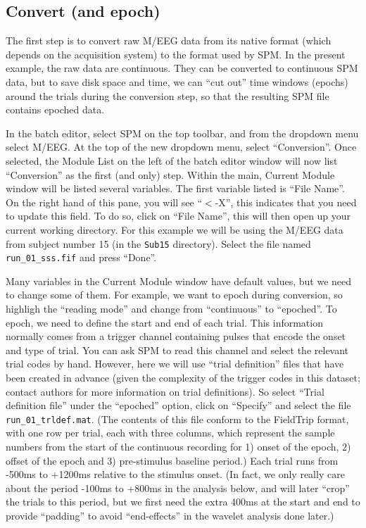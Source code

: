 \subsection{Convert (and epoch)}

The first step is to convert raw M/EEG data from its native format (which depends on the acquisition system) to the format used by SPM.  In the present example, the raw data are continuous. They can be converted to continuous SPM data, but to save disk space and time, we can ``cut out'' time windows (epochs) around the trials during the conversion step, so that the resulting SPM file contains epoched data.

In the batch editor, select SPM on the top toolbar, and from the dropdown menu select M/EEG. At the top of the new dropdown menu, select ``Conversion''. Once selected, the Module List on the left of the batch editor window will now list ``Conversion'' as the first (and only) step. Within the main, Current Module window will be listed several variables. The first variable listed is ``File Name''. On the right hand of this pane, you will see ``\(<\)-X'', this indicates that you need to update this field. To do so, click on ``File Name'', this will then open up your current working directory. For this example we will be using the M/EEG data from subject number 15 (in the \texttt{Sub15} directory). Select the file named \texttt{run\_01\_sss.fif} and press ``Done''.

Many variables in the Current Module window have default values, but we need to change some of them. For example, we want to epoch during conversion, so highligh the ``reading mode'' and change from ``continuous'' to ``epoched''. To epoch, we need to define the start and end of each trial. This information normally comes from a trigger channel containing pulses that encode the onset and type of trial. You can ask SPM to read this channel and select the relevant trial codes by hand. However, here we will use ``trial definition'' files that have been created in advance (given the complexity of the trigger codes in this dataset; contact authors for more information on trial definitions). So select ``Trial definition file'' under the ``epoched'' option, click on ``Specify'' and select the file \texttt{run\_01\_trldef.mat}. (The contents of this file conform to the FieldTrip format, with one row per trial, each with three columns, which represent the sample numbers from the start of the continuous recording for 1) onset of the epoch, 2) offset of the epoch and 3) pre-stimulus baseline period.) Each trial runs from -500ms to +1200ms relative to the stimulus onset. (In fact, we only really care about the period -100ms to +800ms in the analysis below, and will later ``crop'' the trials to this period, but we first need the extra 400ms at the start and end to provide ``padding'' to avoid ``end-effects'' in the wavelet analysis done later.)

